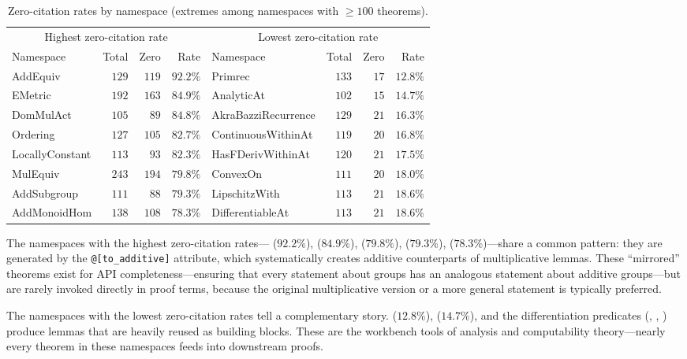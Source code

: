 \begin{table}[ht]
\centering
\caption{Zero-citation rates by namespace (extremes among namespaces with $\ge 100$ theorems).}
\label{tab:thm-leaves}
\small
\begin{tabular}{lrrrlrrr}
\toprule
\multicolumn{4}{c}{Highest zero-citation rate} & \multicolumn{4}{c}{Lowest zero-citation rate} \\
\cmidrule(lr){1-4} \cmidrule(lr){5-8}
Namespace & Total & Zero & Rate & Namespace & Total & Zero & Rate \\
\midrule
AddEquiv           & $129$  & $119$ & $92.2\%$ & Primrec            & $133$ & $17$ & $12.8\%$ \\
EMetric            & $192$  & $163$ & $84.9\%$ & AnalyticAt         & $102$ & $15$ & $14.7\%$ \\
DomMulAct          & $105$  & $89$  & $84.8\%$ & AkraBazziRecurrence& $129$ & $21$ & $16.3\%$ \\
Ordering           & $127$  & $105$ & $82.7\%$ & ContinuousWithinAt & $119$ & $20$ & $16.8\%$ \\
LocallyConstant    & $113$  & $93$  & $82.3\%$ & HasFDerivWithinAt  & $120$ & $21$ & $17.5\%$ \\
MulEquiv           & $243$  & $194$ & $79.8\%$ & ConvexOn           & $111$ & $20$ & $18.0\%$ \\
AddSubgroup        & $111$  & $88$  & $79.3\%$ & LipschitzWith      & $113$ & $21$ & $18.6\%$ \\
AddMonoidHom       & $138$  & $108$ & $78.3\%$ & DifferentiableAt   & $113$ & $21$ & $18.6\%$ \\
\bottomrule
\end{tabular}
\end{table}

The namespaces with the highest zero-citation rates--- ($92.2\%$),  ($84.9\%$),  ($79.8\%$),  ($79.3\%$),  ($78.3\%$)---share a common pattern: they are generated by the \texttt{@[to\_additive]} attribute, which systematically creates additive counterparts of multiplicative lemmas. These ``mirrored'' theorems exist for API completeness---ensuring that every statement about groups has an analogous statement about additive groups---but are rarely invoked directly in proof terms, because the original multiplicative version or a more general statement is typically preferred.

The namespaces with the lowest zero-citation rates tell a complementary story.  ($12.8\%$),  ($14.7\%$), and the differentiation predicates (, , ) produce lemmas that are heavily reused as building blocks. These are the workbench tools of analysis and computability theory---nearly every theorem in these namespaces feeds into downstream proofs.

